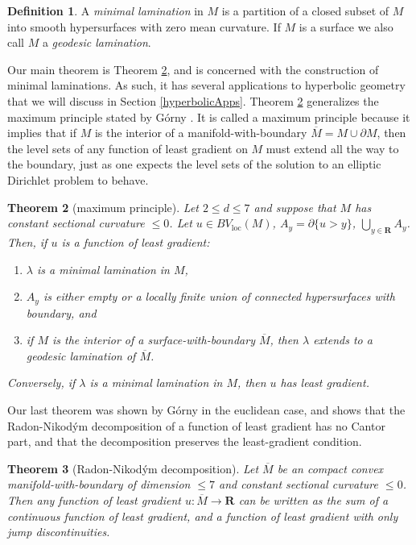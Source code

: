 \documentclass[reqno,10pt]{amsart}
\newcommand{\RR}{\mathbf{R}}
\newcommand{\dfn}[1]{\emph{#1}\index{#1}}
\newcommand{\loc}{\mathrm{loc}}
\newtheorem{theorem}{Theorem}[section]
\theoremstyle{definition}
\newtheorem{definition}[theorem]{Definition}
\numberwithin{equation}{section}
\begin{document}
\begin{definition}
A \dfn{minimal lamination} in $M$ is a partition of a closed subset of $M$ into smooth hypersurfaces with zero mean curvature.
If $M$ is a surface we also call $M$ a \dfn{geodesic lamination}.
\end{definition}

Our main theorem is Theorem \ref{main thm}, and is concerned with the construction of minimal laminations.
As such, it has several applications to hyperbolic geometry that we will discuss in Section \ref{hyperbolicApps}.
Theorem \ref{main thm} generalizes the maximum principle stated by G\'orny \cite[Proposition 3.4, Corollary 3.5]{górny2017planar}.
It is called a maximum principle because it implies that if $M$ is the interior of a manifold-with-boundary $\overline M = M \cup \partial M$, then the level sets of any function of least gradient on $M$ must extend all the way to the boundary, just as one expects the level sets of the solution to an elliptic Dirichlet problem to behave.

\begin{theorem}[maximum principle]\label{main thm}
Let $2 \leq d \leq 7$ and suppose that $M$ has constant sectional curvature $\leq 0$.
Let $u \in BV_\loc(M)$, $A_y = \partial \{u > y\}$, $\bigcup_{y \in \RR} A_y$.
Then, if $u$ is a function of least gradient:
\begin{enumerate}
\item $\lambda$ is a minimal lamination in $M$,
\item $A_y$ is either empty or a locally finite union of connected hypersurfaces with boundary, and 
\item if $M$ is the interior of a surface-with-boundary $\overline M$, then $\lambda$ extends to a geodesic lamination of $\overline M$.
\end{enumerate}
Conversely, if $\lambda$ is a minimal lamination in $M$, then $u$ has least gradient.
\end{theorem}

Our last theorem was shown by G\'orny \cite[Theorem 1.2]{górny2017planar} in the euclidean case, and shows that the Radon-Nikod\'ym decomposition of a function of least gradient has no Cantor part, and that the decomposition preserves the least-gradient condition.

\begin{theorem}[Radon-Nikod\'ym decomposition]\label{Gorny regularity}
Let $\overline M$ be an compact convex manifold-with-boundary of dimension $\leq 7$ and constant sectional curvature $\leq 0$.
Then any function of least gradient $u: \overline M \to \RR$ can be written as the sum of a continuous function of least gradient, and a function of least gradient with only jump discontinuities.
\end{theorem}
\end{document}
